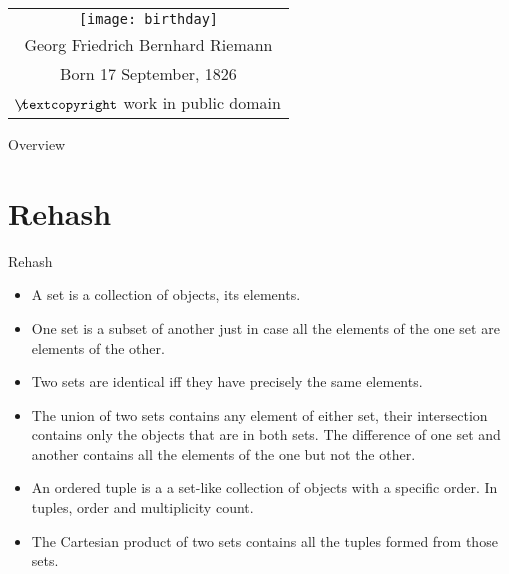 \setcounter{framenumber}{97}
\begin{frame}
  \maketitle
\end{frame}

\begin{frame}
\begin{center}
			\begin{tabular}{c}
			 	\texttt{[image: birthday]}\\
				Georg Friedrich Bernhard Riemann\\
				Born 17 September, 1826\\
				{\tiny $\not\hspace{-1ex}\textcopyright$ work in public domain} 
			\end{tabular}
		\end{center}	

\end{frame}

\begin{frame}{Overview}
\tableofcontents
\end{frame}

\section{Rehash}
\begin{frame}{Rehash}
	
\begin{itemize}

		\item A set is a collection of objects, its elements.
		
		\item One set is a subset of another just in case all the elements of the one set are elements of the other. 
				
		\item Two sets are identical iff they have precisely the same elements. 
		
		\item The union of two sets contains any element of either set, their intersection contains only the objects that are in both sets. The difference of one set and another contains all the elements of the one but not the other.
		
		\item An ordered tuple is a a set-like collection of objects with a specific order. In tuples, order and multiplicity count.
		
		\item The Cartesian product of two sets contains all the tuples formed from those sets.
		
		\end{itemize}
		
	\end{frame}
		
